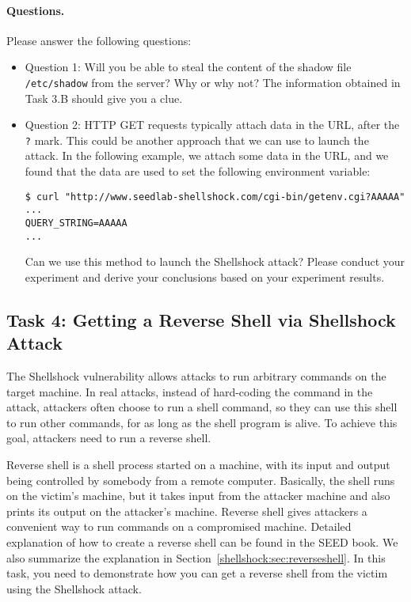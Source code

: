 \paragraph{Questions.} Please answer the following questions:
\begin{itemize}
\item Question 1: Will you be able to steal the content of 
the shadow file \texttt{/etc/shadow} from the server? Why or why not?  
The information obtained in Task 3.B should give you a clue. 

\item Question 2: HTTP GET requests typically attach data in the URL, 
after the \texttt{?} mark. This could be another 
approach that we can use to launch the attack. In the following example,
we attach some data in the URL, and we found that the data are used to set
the following environment variable: 

\begin{lstlisting}
$ curl "http://www.seedlab-shellshock.com/cgi-bin/getenv.cgi?AAAAA"
...
QUERY_STRING=AAAAA
...
\end{lstlisting}

Can we use this method to launch the Shellshock attack? Please conduct your 
experiment and derive your conclusions based on your experiment results. 
     
\end{itemize}

  


\subsection{Task 4: Getting a Reverse Shell via Shellshock Attack}

The Shellshock vulnerability allows attacks to run arbitrary commands on
the target machine. In real attacks, instead of hard-coding the command 
in the attack, attackers often choose to run a shell
command, so they can use this shell to run other commands,
for as long as the shell program is alive. 
To achieve this goal, attackers need to run a reverse shell.

Reverse shell is a shell process started on a machine, with its input and output being
controlled by somebody from a remote computer. Basically, the shell runs
on the victim's machine, but it takes input from the attacker machine and
also prints its output on the attacker's machine. Reverse shell
gives attackers a convenient way to run commands on a compromised machine. 
Detailed explanation of how to create a reverse shell can be found in 
the SEED book. We also summarize the explanation in
Section~\ref{shellshock:sec:reverseshell}.
In this task, you need to demonstrate 
how you can get a reverse shell from the victim using the Shellshock attack. 



